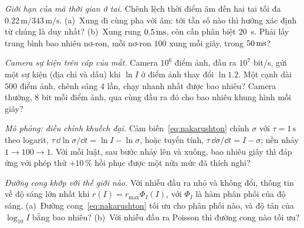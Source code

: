 \begin{exercise}[\lvlB]
\label{ex:11:4}
\emph{Giới hạn của mã thời gian ở tai.} Chênh lệch thời điểm âm đến hai tai tối đa $0.22\,\text{m}/343\,\text{m/s}$. (a)~Xung đi cùng pha với âm: tới tần số nào thì hướng xác định từ chúng là duy nhất? (b)~Xung rung $0.5\,\text{ms}$, còn cần phân biệt $20$~\textmu s. Phải lấy trung bình bao nhiêu nơ-ron, mỗi nơ-ron $100$ xung mỗi giây, trong $50\,\text{ms}$?
\end{exercise}

\begin{exercise}[\lvlB]
\label{ex:11:5}
\emph{Camera sự kiện trên cáp của mắt.} Camera $10^6$ điểm ảnh, đầu ra $10^7$ bit/s, gửi một sự kiện (địa chỉ và dấu) khi $\ln I$ ở điểm ảnh thay đổi $\ln1.2$. Một cạnh dài $500$ điểm ảnh, chênh sáng $4$ lần, chạy nhanh nhất được bao nhiêu? Camera thường, $8$ bit mỗi điểm ảnh, qua cùng đầu ra đó cho bao nhiêu khung hình mỗi giây?
\end{exercise}

\begin{exercise}[\lvlB]
\label{ex:11:6}
\emph{Mô phỏng: điều chỉnh khuếch đại.} Cảm biến~\eqref{eq:nakarushton} chỉnh $\sigma$ với $\tau=1\,\text{s}$ theo logarit, $\tau\,\dd\ln\sigma/\dd t=\ln I-\ln\sigma$, hoặc tuyến tính, $\tau\,\dd\sigma/\dd t=I-\sigma$; nền nhảy $1\to100\to1$. Với mỗi luật, sau bước nhảy lên và xuống, bao nhiêu giây thì đáp ứng với phép thử $+10\,\%$ hồi phục được một nửa mức đã thích nghi?
\end{exercise}

\begin{exercise}[\lvlC]
\label{ex:11:7}
\emph{Đường cong khớp với thế giới nào.} Với nhiễu đầu ra nhỏ và không đổi, thông tin về độ sáng lớn nhất khi $r(I)=r_{\max}\Phi_I(I)$, với $\Phi_I$ là hàm phân phối của độ sáng. (a)~Đường cong~\eqref{eq:nakarushton} tối ưu cho phân phối nào, và độ tản của $\log_{10}I$ bằng bao nhiêu? (b)~Với nhiễu đầu ra Poisson thì đường cong nào tối ưu?
\end{exercise}
